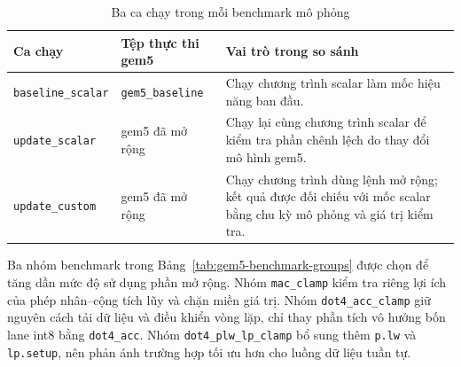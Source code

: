 \documentclass[../DoAn.tex]{subfiles}
\begin{document}
\begin{table}[H]
    \centering
    \small
    \setlength{\tabcolsep}{4pt}
    \renewcommand{\arraystretch}{1.18}
    \begin{tabular}{|>{\raggedright\arraybackslash}p{3.15cm}|>{\raggedright\arraybackslash}p{3.35cm}|>{\raggedright\arraybackslash}p{5.60cm}|}
        \hline
        \textbf{Ca chạy} & \textbf{Tệp thực thi gem5} & \textbf{Vai trò trong so sánh} \\
        \hline
        \texttt{baseline}\newline\texttt{\_scalar} & \texttt{gem5\_baseline} & Chạy chương trình scalar làm mốc hiệu năng ban đầu. \\
        \hline
        \texttt{update}\newline\texttt{\_scalar} & gem5 đã mở rộng & Chạy lại cùng chương trình scalar để kiểm tra phần chênh lệch do thay đổi mô hình gem5. \\
        \hline
        \texttt{update}\newline\texttt{\_custom} & gem5 đã mở rộng & Chạy chương trình dùng lệnh mở rộng; kết quả được đối chiếu với mốc scalar bằng chu kỳ mô phỏng và giá trị kiểm tra. \\
        \hline
    \end{tabular}
    \caption{Ba ca chạy trong mỗi benchmark mô phỏng}
    \label{tab:gem5-benchmark-cases}
\end{table}

Ba nhóm benchmark trong Bảng~\ref{tab:gem5-benchmark-groups} được chọn để tăng dần mức độ sử dụng phần mở rộng. Nhóm \texttt{mac\_clamp} kiểm tra riêng lợi ích của phép nhân--cộng tích lũy và chặn miền giá trị. Nhóm \texttt{dot4\_acc\_clamp} giữ nguyên cách tải dữ liệu và điều khiển vòng lặp, chỉ thay phần tích vô hướng bốn lane int8 bằng \texttt{dot4\_acc}. Nhóm \texttt{dot4\_plw\_lp\_clamp} bổ sung thêm \texttt{p.lw} và \texttt{lp.setup}, nên phản ánh trường hợp tối ưu hơn cho luồng dữ liệu tuần tự.
\end{document}
